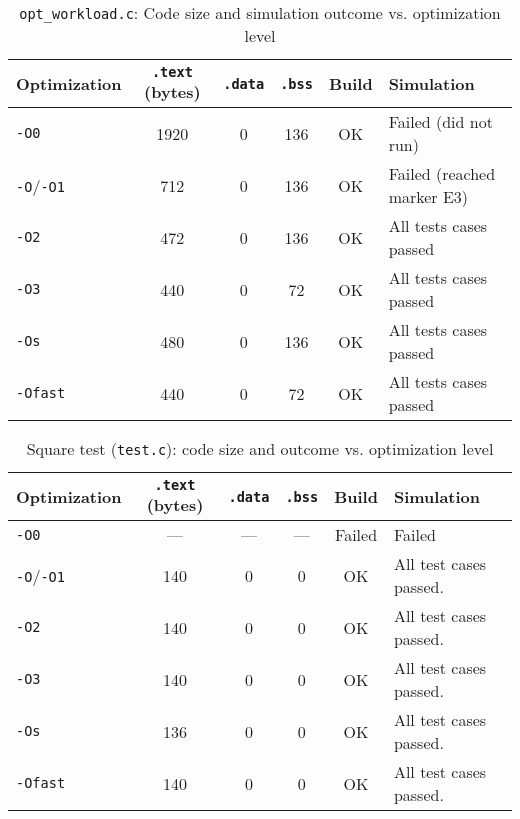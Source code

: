 \begin{table}[htbp]
  \centering
  \caption{\texttt{opt\_workload.c}: Code size and simulation outcome vs. optimization level}
  \label{tab:opt-workload}
  \begin{tabularx}{\textwidth}{@{} l c c c c >{\raggedright\arraybackslash}X @{}}
    \toprule
    \textbf{Optimization}
      & \textbf{\texttt{.text} (bytes)}
      & \textbf{\texttt{.data}}
      & \textbf{\texttt{.bss}}
      & \textbf{Build}
      & \textbf{Simulation} \\
    \midrule
    \texttt{-O0}           & 1920 & 0 & 136 & OK & Failed (did not run) \\
    \texttt{-O}/\texttt{-O1} & 712  & 0 & 136 & OK &Failed (reached marker E3) \\
    \texttt{-O2}           & 472  & 0 & 136 & OK & All tests cases passed \\
    \texttt{-O3}           & 440  & 0 & 72  & OK & All tests cases passed \\
    \texttt{-Os}           & 480  & 0 & 136 & OK & All tests cases passed \\
    \texttt{-Ofast}        & 440  & 0 & 72  & OK & All tests cases passed \\
    \bottomrule
  \end{tabularx}
\end{table}


\begin{table}[htbp]
  \centering
  \caption{Square test (\texttt{test.c}): code size and outcome vs. optimization level}
  \label{tab:square-test}
  \begin{tabularx}{\textwidth}{@{} l c c c c >{\raggedright\arraybackslash}X @{}}
    \toprule
    \textbf{Optimization}
      & \textbf{\texttt{.text} (bytes)}
      & \textbf{\texttt{.data}}
      & \textbf{\texttt{.bss}}
      & \textbf{Build}
      & \textbf{Simulation} \\
    \midrule
    \texttt{-O0}            & --- & --- & --- & Failed &               Failed \\
    \texttt{-O}/\texttt{-O1} & 140 & 0   & 0   & OK                    & All test cases passed. \\
    \texttt{-O2}            & 140 & 0   & 0   & OK                    & All test cases passed. \\
    \texttt{-O3}            & 140 & 0   & 0   & OK                    & All test cases passed. \\
    \texttt{-Os}            & 136 & 0   & 0   & OK                    & All test cases passed. \\
    \texttt{-Ofast}         & 140 & 0   & 0   & OK                    & All test cases passed. \\
    \bottomrule
  \end{tabularx}
\end{table}

